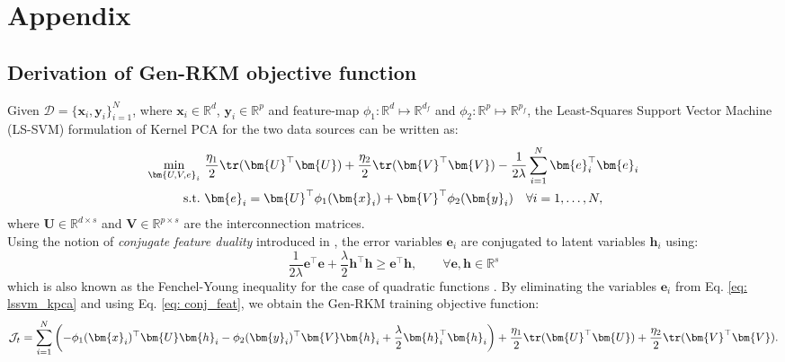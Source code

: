\documentclass[preview,border=0.3pt]{standalone}
\begin{document}
\section{Appendix}
%
\subsection{Derivation of Gen-RKM objective function}
\label{subsec: Gen-RKM objective function}
Given $\mathcal{D}= \{\bm{x}_i, \bm{y}_i\}_{i=1}^{N} $, where $ \bm{x}_i \in \mathbb{R}^d $, $ \bm{y}_i \in \mathbb{R}^p $ and feature-map $\phi_{1}: \mathbb{R}^{d}\mapsto \mathbb{R}^{d_{f}}$ and $\phi_{2}: \mathbb{R}^{p}\mapsto \mathbb{R}^{p_{f}}$, the Least-Squares Support Vector Machine (LS-SVM) formulation of Kernel PCA \cite{suykens_least_2002} for the two data sources can be written as:
\begin{equation}
    \begin{aligned}
        \underset{\bm{U,V,e}_i}{\min} & ~\dfrac{\eta_{1}}{2}\tr(\bm{U}^\top \bm{U} ) + \dfrac{\eta_{2}}{2}\tr(\bm{V}^\top \bm{V}) - \dfrac{1}{2\lambda}\sum_{i=1}^{N}\bm{e}_{i}^\top \bm{e}_i \\
        \text{s.t.}                   & ~ \bm{e}_i=\bm{U}^{\top}\phi_{1}(\bm{x}_i) + \bm{V}^{\top}\phi_{2}(\bm{y}_i) \quad \forall i=1,\ldots,N,
    \end{aligned}
    \label{eq: lssvm_kpca}
\end{equation}
where $ \bm{U} \in \mathbb{R}^{d \times s} $ and $ \bm{V} \in \mathbb{R}^{p \times s} $ are the interconnection matrices.\\

Using the notion of \emph{conjugate feature duality} introduced in \cite{suykens_deep_2017}, the error variables $\bm{e}_{i}$ are conjugated to latent variables $\bm{h}_{i}$ using:
%
\begin{equation}
    \frac{1}{2\lambda}\bm{e}^{\top}\bm{e} + \frac{\lambda}{2}\bm{h}^{\top}\bm{h} \geq \bm{e}^{\top}\bm{h}, \qquad \forall \bm{e}, \bm{h} \in \mathbb{R}^{s}
    \label{eq: conj_feat}
\end{equation}
which is also known as the Fenchel-Young inequality for the case of quadratic functions \cite{rockafeller1987}. By eliminating the variables $\bm{e}_{i}$ from Eq. \ref{eq: lssvm_kpca} and using Eq. \ref{eq: conj_feat}, we obtain the Gen-RKM training objective function:
%
\begin{equation}
    \mathcal{J}_{t} = \sum_{i=1}^{N} \left(-\phi_{1}(\bm{x}_{i})^\top \bm{U}\bm{h}_i - \phi_{2}(\bm{y}_{i})^\top \bm{V} \bm{h}_i + \frac{\lambda}{2} \bm{h}_{i}^\top \bm{h}_i\right) + \frac{\eta_{1}}{2}\tr(\bm{U}^\top \bm{U}) + \frac{\eta_{2}}{2}\tr(\bm{V}^\top \bm{V}) .
\end{equation}
%
\end{document}
